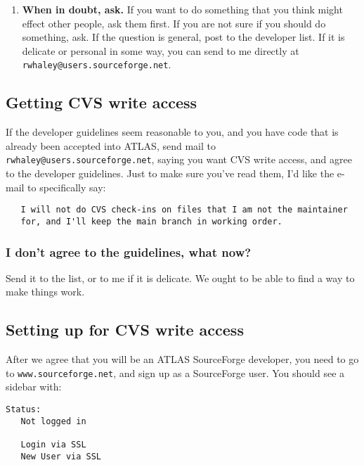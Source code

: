 \documentclass[11pt]{article}
\begin{document}
\begin{enumerate}
\item{\bf When in doubt, ask.} If you want to do something that you think
might effect other people, ask them first.  If you are not sure if you should
do something, ask.  If the question is general, post to the developer list.
If it is delicate or personal in some way, you can send to me directly at
{\tt rwhaley@users.sourceforge.net}.
\end{enumerate}

\subsection{Getting CVS write access}
If the developer guidelines seem reasonable to you, and you have code that
is already been accepted into ATLAS, send mail to
{\tt rwhaley@users.sourceforge.net}, saying you want CVS write access, and
agree to the developer guidelines.  Just to make sure you've read them,
I'd like the e-mail to specifically say:
\begin{verbatim}
   I will not do CVS check-ins on files that I am not the maintainer
   for, and I'll keep the main branch in working order.
\end{verbatim}

\subsubsection{I don't agree to the guidelines, what now?}
Send it to the list, or to me if it is delicate.  We ought to be able
to find a way to make things work.


\subsection{Setting up for CVS write access}
After we agree that you will be an ATLAS SourceForge developer, you need
to go to {\tt www.sourceforge.net}, and sign up as a SourceForge user.
You should see a sidebar with:
\begin{verbatim}
Status:
   Not logged in

   Login via SSL
   New User via SSL
\end{verbatim}
\end{document}

